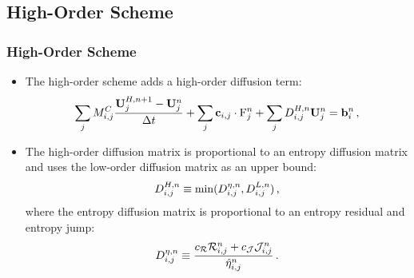 \documentclass{beamer} \useoutertheme{infolines}
\begin{document}
\subsection{High-Order Scheme}
\begin{frame}
\frametitle{High-Order Scheme}

\begin{itemize}
  \item The high-order scheme adds a high-order diffusion term:
    \begin{equation}
      \sum_j\consistentmassentry
        \frac{\solutionvector_j^{H,n+1}-\solutionvector_j^n}{\dt}
        + \sum_j\gradiententry\cdot\consfluxinterpolant_j^n
        + \sum_j\diffusionmatrixletter\ij^{H,n}\solutionvector_j^n
        = \ssrhs_i^n \eqc
    \end{equation}
  \item The high-order diffusion matrix is proportional to an entropy diffusion matrix
    and uses the low-order diffusion matrix as an upper bound:
    \begin{equation}
      D^{H,n}_{i,j} \equiv \min(
        D^{\eta,n}_{i,j},D^{L,n}_{i,j}) \,,
    \end{equation}
    where the entropy diffusion matrix is proportional to an entropy residual and
    entropy jump:
    \begin{equation}
      D^{\eta,n}_{i,j} \equiv
        \frac{c_{\mathcal{R}}\mathcal{R}_{i,j}^n
          + c_{\mathcal{J}}\mathcal{J}_{i,j}^n}{\hat{\eta}_{i,j}^n} \,.
    \end{equation}
\end{itemize}

\end{frame}
\end{document}
